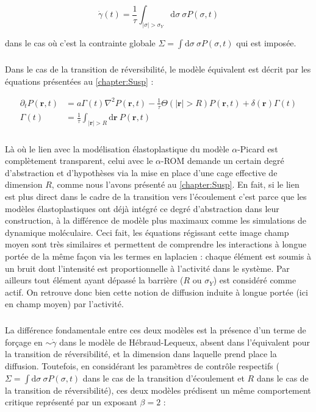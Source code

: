 \begin{equation}
	\dot{\gamma} (t) = \frac{1}{\tau}\int_{|\sigma|>\sigma_Y}\mathrm{d}\sigma ~ \sigma P(\sigma, t)
\end{equation}

\noindent dans le cas où c'est la contrainte globale $\Sigma = \int \mathrm{d}\sigma ~ \sigma P(\sigma,t)$ qui est imposée.

\subparagraph{}Dans le cas de la transition de réversibilité, le modèle équivalent est décrit par les équations présentées au \autoref{chapter:Susp} :

\begin{equation}
\begin{aligned}
    \partial_t P(\mathbf{r}, t) &= a\Gamma (t)\nabla^2 P(\mathbf{r}, t) - \frac{1}{\tau}\Theta(|\mathbf{r}|>R)P(\mathbf{r}, t) + \delta(\mathbf{r})\Gamma (t)\\
     \Gamma (t) &= \frac{1}{\tau}\int_{|\mathbf{r}|>R}\mathrm{d}\mathbf{r}~P(\mathbf{r}, t)
    \label{eq:muHLDiffdisc}
\end{aligned}
\end{equation} 

\subparagraph{}Là où le lien avec la modélisation élastoplastique du modèle $\alpha$-Picard est complètement transparent, celui avec le $\alpha$-ROM demande un certain degré d'abstraction et d'hypothèses via la mise en place d'une cage effective de dimension $R$, comme nous l'avons présenté au \autoref{chapter:Susp}. En fait, si le lien est plus direct dans le cadre de la transition vers l'écoulement c'est parce que les modèles élastoplastiques ont déjà intégré ce degré d'abstraction dans leur construction, à la différence de modèle plus maximaux comme les simulations de dynamique moléculaire. Ceci fait, les équations régissant cette image champ moyen sont très similaires et permettent de comprendre les interactions à longue portée de la même façon via les termes en laplacien : chaque élément est soumis à un bruit dont l'intensité est proportionnelle à l'activité dans le système. Par ailleurs tout élément ayant dépassé la barrière ($R$ ou $\sigma_Y$) est considéré comme actif. On retrouve donc bien cette notion de diffusion induite à longue portée (ici en champ moyen) par l'activité.

\subparagraph{}La différence fondamentale entre ces deux modèles est la présence d'un terme de forçage en $\sim \dot{\gamma}$ dans le modèle de Hébraud-Lequeux, absent dans l'équivalent pour la transition de réversibilité, et la dimension dans laquelle prend place la diffusion. Toutefois, en considérant les paramètres de contrôle respectifs ($\Sigma = \int \mathrm{d}\sigma ~ \sigma P(\sigma,t)$ dans le cas de la transition d'écoulement et $R$ dans le cas de la transition de réversibilité), ces deux modèles prédisent un même comportement critique représenté par un exposant $\beta = 2$ :

